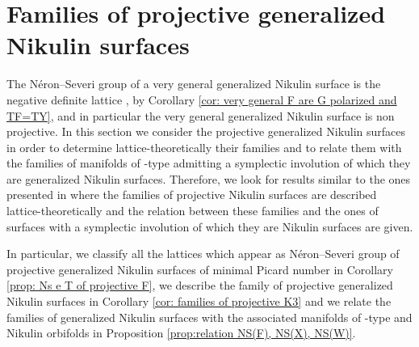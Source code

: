 \documentclass{amsart}
\makeatletter
\theoremstyle{definition}
\numberwithin{equation}{section}
\numberwithin{equation}{section} \theoremstyle{definition}
\newcounter{mathrecordid}
\newcommand{\mathboxbegin}[1]{%
  \stepcounter{mathrecordid}%
  \immediate\write\mathrecords{\themathrecordid,#1}%
  \special{pdf:bann << /Type /Annot /Subtype /Link /Border [0 0 0]
    /MathBoxID \themathrecordid /F 2
    /A << /S /URI /URI (urn:mathbox:\themathrecordid) >> >>}}
\newcommand{\mathboxinlineplain}[1]{$#1$}
\newcommand{\mathboxinline}[1]{%
  $\mathboxbegin{inline}%
  \special{pdf:literal direct /MathBoxBegin\themathrecordid\space MP}%
  #1\special{pdf:literal direct /MathBoxEnd\themathrecordid\space MP}%
  \special{pdf:eann}$}
\newcommand{\recordmath}{%
  \ifmeasuring@\expandafter\mathboxinlineplain
  \else\expandafter\mathboxinline\fi}
\makeatother
\begin{document}
\section{Families of projective generalized Nikulin surfaces}\label{Families of projective generalized Nikulin surfaces}\label{section: Families of projective generalized Nikulin surfaces}
The N\'eron--Severi group of a very general generalized Nikulin surface is the negative definite lattice \recordmath{E_7(-2)}, by Corollary \ref{cor: very general F are G polarized and TF=TY}, and in particular the very general generalized Nikulin surface is non projective. In this section we consider the projective generalized Nikulin surfaces in order to determine lattice-theoretically  their families and to relate them with the families of manifolds of \recordmath{K3^{[2]}}-type admitting a symplectic involution of which they are generalized Nikulin surfaces. 
Therefore, we look for results similar to the ones presented in \cite[Section 2]{GS} where the families of projective Nikulin surfaces are described lattice-theoretically and the relation between these families and the ones of  \recordmath{K3} surfaces with a symplectic involution of which they are Nikulin surfaces are given. 

In particular, we classify all the lattices which appear as N\'eron--Severi group of projective generalized Nikulin surfaces of minimal Picard number in Corollary \ref{prop: Ns e T of projective F}, we describe the family of projective generalized Nikulin surfaces in Corollary \ref{cor: families of projective K3} and we relate the families of generalized Nikulin surfaces with the associated manifolds of \recordmath{K3^{[2]}}-type and Nikulin orbifolds in Proposition \ref{prop:relation NS(F), NS(X), NS(W)}. 
\end{document}
